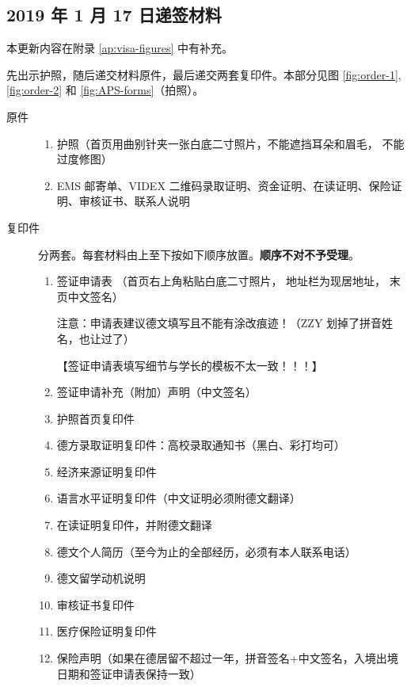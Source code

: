\subsection{2019 年 1 月 17 日递签材料}\label{sec:visa-material-17Jan}
本更新内容在附录 \ref{ap:visa-figures} 中有补充。

先出示护照，随后递交材料原件，最后递交两套复印件。本部分见图 \ref{fig:order-1}, \ref{fig:order-2} 和 \ref{fig:APS-forms}（拍照）。
\begin{description}
  \item[原件]
  \begin{enumerate}
    \item 护照（首页用曲别针夹一张白底二寸照片，不能遮挡耳朵和眉毛， 不能过度修图） 
    \item EMS 邮寄单、VIDEX 二维码录取证明、资金证明、在读证明、保险证明、审核证书、联系人说明
  \end{enumerate} 
  \item[复印件] 分两套。每套材料由上至下按如下顺序放置。\textbf{\color{red}顺序不对不予受理}。 
  \begin{enumerate}
    \item 签证申请表 （首页右上角粘贴白底二寸照片， 地址栏为现居地址， 末页中文签名） 

    注意：申请表建议德文填写且不能有涂改痕迹！（ZZY 划掉了拼音姓名，也让过了） 
    
    【签证申请表填写细节与学长的模板不太一致！！！】 
    
    \item 签证申请补充（附加）声明（中文签名） 
    
    \item 护照首页复印件 
    
    \item 德方录取证明复印件：高校录取通知书（黑白、彩打均可）
    
    \item 经济来源证明复印件 
    
    \item 语言水平证明复印件（中文证明必须附德文翻译） 
    
    \item 在读证明复印件，并附德文翻译 
    
    \item 德文个人简历（至今为止的全部经历，必须有本人联系电话） 
    
    \item 德文留学动机说明 
    
    \item 审核证书复印件 
    
    \item 医疗保险证明复印件 
    
    \item 保险声明（如果在德居留不超过一年，拼音签名+中文签名，入境出境日期和签证申请表保持一致）
  \end{enumerate} 
\end{description} 

